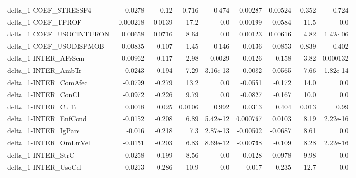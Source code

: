 \begin{tabular}{lrrrrrrrr}
delta\_1-COEF\_STRESSF4                  &      0.0278 &         0.12 &   -0.716 &    0.474 &    0.00287 &     0.00524 &       -0.352 &         0.724 \\
delta\_1-COEF\_TPROF                     &   -0.000218 &      -0.0139 &     17.2 &      0.0 &   -0.00199 &     -0.0584 &         11.5 &           0.0 \\
delta\_1-COEF\_USOCINTURON               &    -0.00658 &      -0.0716 &     8.64 &      0.0 &    0.00123 &     0.00616 &         4.82 &      1.42e-06 \\
delta\_1-COEF\_USODISPMOB                &     0.00835 &        0.107 &     1.45 &    0.146 &     0.0136 &      0.0853 &        0.839 &         0.402 \\
delta\_1-INTER\_AFrSem                   &    -0.00962 &       -0.117 &     2.98 &   0.0029 &     0.0126 &       0.158 &         3.82 &      0.000132 \\
delta\_1-INTER\_AmbTr                    &     -0.0243 &       -0.194 &     7.29 & 3.16e-13 &     0.0082 &      0.0565 &         7.66 &      1.82e-14 \\
delta\_1-INTER\_ComAfec                  &     -0.0799 &       -0.279 &     13.2 &      0.0 &    -0.0551 &      -0.172 &         14.0 &           0.0 \\
delta\_1-INTER\_ConCl                    &     -0.0972 &       -0.226 &     9.79 &      0.0 &    -0.0827 &      -0.167 &         10.0 &           0.0 \\
delta\_1-INTER\_CulFr                    &      0.0018 &        0.025 &   0.0106 &    0.992 &     0.0313 &       0.404 &        0.013 &          0.99 \\
delta\_1-INTER\_EnfCond                  &     -0.0152 &       -0.208 &     6.89 & 5.42e-12 &   0.000767 &      0.0103 &         8.19 &      2.22e-16 \\
delta\_1-INTER\_IgPare                   &      -0.016 &       -0.218 &      7.3 & 2.87e-13 &   -0.00502 &     -0.0687 &         8.61 &           0.0 \\
delta\_1-INTER\_OmLmVel                  &     -0.0151 &       -0.203 &     6.83 & 8.69e-12 &   -0.00768 &      -0.109 &         8.28 &      2.22e-16 \\
delta\_1-INTER\_StrC                     &     -0.0258 &       -0.199 &     8.56 &      0.0 &    -0.0128 &     -0.0978 &         9.98 &           0.0 \\
delta\_1-INTER\_UsoCel                   &     -0.0213 &       -0.286 &     10.9 &      0.0 &     -0.017 &      -0.235 &         12.7 &           0.0 \\

\end{tabular}

